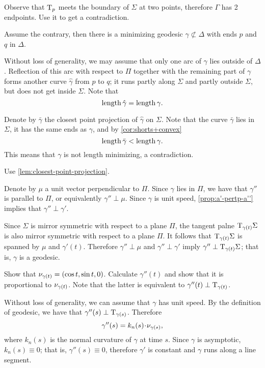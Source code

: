 Observe that $\mathrm{T}_p$ meets the boundary of $\Sigma$ at two points,
therefore $\Gamma$ has 2 endpoints.
Use it to get a contradiction.

 Assume the contrary,
then there is a minimizing geodesic $\gamma\not\subset\Delta$ with ends $p$ and $q$ in $\Delta$.

Without loss of generality, we may assume that only one arc of $\gamma$ lies outside of $\Delta$.
Reflection of this arc  with respect to $\Pi$ together with the remaining part of $\gamma$ forms another curve $\hat\gamma$ from $p$ to $q$;
it runs partly along $\Sigma$ 
and partly outside $\Sigma$,
but does not get inside $\Sigma$.
Note that
\[\mathop{\rm length}\nolimits\hat\gamma=\mathop{\rm length}\nolimits\gamma.\]


Denote by $\bar\gamma$ the closest point projection of $\hat\gamma$ on $\Sigma$.
Note that the curve $\bar\gamma$ lies in $\Sigma$, 
it has the same ends as $\gamma$,
and by \ref{cor:shorts+convex}
\[\mathop{\rm length}\nolimits\bar\gamma<\mathop{\rm length}\nolimits\gamma.\]
This means that $\gamma$ is not length minimizing, 
a contradiction.

 Use \ref{lem:closest-point-projection}.

Denote by $\mu$ a unit vector perpendicular to $\Pi$.
Since $\gamma$ lies in $\Pi$, we have that $\gamma''$ is parallel to $\Pi$, or equivalently $\gamma''\perp \mu$.
Since $\gamma$ is unit speed, \ref{prop:a'-pertp-a''} implies that $\gamma''\perp\gamma'$.

Since $\Sigma$ is mirror symmetric with respect to  a plane $\Pi$,
the tangent palne $\mathrm{T}_{\gamma(t)}\Sigma$ is also mirror symmetric with respect to  a plane $\Pi$.
It follows that $\mathrm{T}_{\gamma(t)}\Sigma$ is spanned by $\mu$ and $\gamma'(t)$.
Therefore $\gamma''\perp \mu$ and $\gamma''\perp\gamma'$ imply $\gamma''\perp\mathrm{T}_{\gamma(t)}\Sigma$;
that is, $\gamma$ is a geodesic.

Show that $\nu_{\gamma(t)}=(\cos t,\sin t, 0)$.
Calculate $\gamma''(t)$ and show that it is proportional to $\nu_{\gamma(t)}$.
Note that the latter is equivalent to $\gamma''(t)\perp\mathrm{T}_{\gamma(t)}$.

 Without loss of generality, we can assume that $\gamma$ has unit speed.
By the definition of geodesic, we have that $\gamma''(s)\perp\mathrm{T}_{\gamma(s)}$. 
Therefore 
\[\gamma''(s)=k_n(s)\cdot\Norm_{\gamma(s)},\]
where $k_n(s)$ is the normal curvature of $\gamma$ at time $s$.
Since $\gamma$ is asymptotic, $k_n(s)\equiv 0$;
that is, $\gamma''(s)\equiv 0$, therefore $\gamma'$ is constant and $\gamma$ runs along a line segment.

